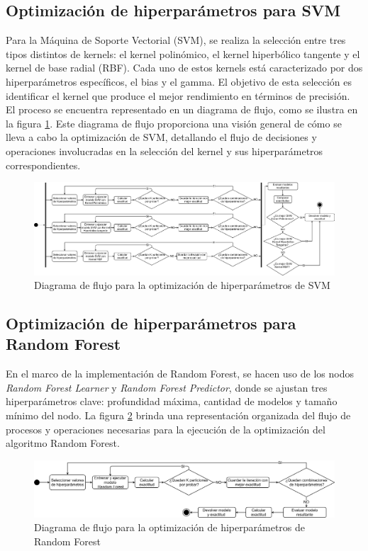 \subsection{Optimización de hiperparámetros para SVM}

Para la Máquina de Soporte Vectorial (SVM), se realiza la selección entre tres tipos distintos de kernels: el kernel polinómico, el kernel hiperbólico tangente y el kernel de base radial (RBF). Cada uno de estos kernels está caracterizado por dos hiperparámetros específicos, el bias y el gamma. El objetivo de esta selección es identificar el kernel que produce el mejor rendimiento en términos de precisión. \\
El proceso se encuentra representado en un diagrama de flujo, como se ilustra en la figura \ref{fig:optimizacion-svm}. Este diagrama de flujo proporciona una visión general de cómo se lleva a cabo la optimización de SVM, detallando el flujo de decisiones y operaciones involucradas en la selección del kernel y sus hiperparámetros correspondientes.

\begin{figure}[H]
	\centering
	\includegraphics[width=1\linewidth]{"figuras/capi 2/hpo/Optimizacion SVM"}
	\caption{Diagrama de flujo para la optimización de hiperparámetros de SVM}
	\label{fig:optimizacion-svm}
\end{figure}


\subsection{Optimización de hiperparámetros para Random Forest}
En el marco de la implementación de Random Forest, se hacen uso de los nodos \textit{Random Forest Learner} y \textit{Random Forest Predictor}, donde se ajustan tres hiperparámetros clave: profundidad máxima, cantidad de modelos y tamaño mínimo del nodo. La figura \ref{fig:optimizacion-randomforest} brinda una representación organizada del flujo de procesos y operaciones necesarias para la ejecución de la optimización del algoritmo Random Forest.

\begin{figure}[H]
	\centering
	\includegraphics[width=1\linewidth]{"figuras/capi 2/hpo/Optimizacion RandomForest"}
	\caption{Diagrama de flujo para la optimización de hiperparámetros de Random Forest}
	\label{fig:optimizacion-randomforest}
\end{figure}



